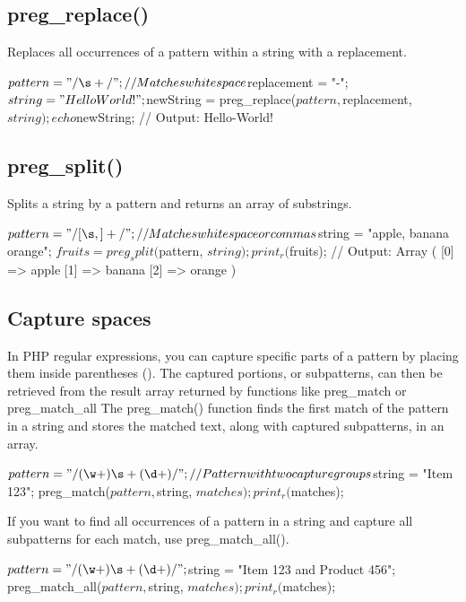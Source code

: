 \documentclass{report}
\begin{document}
 \subsection{preg\_replace()}
 \bigbreak \noindent 
 Replaces all occurrences of a pattern within a string with a replacement.
 \bigbreak \noindent 
 \begin{phpcode}
     $pattern = "/\s+/"; // Matches whitespace
     $replacement = "-";
     $string = "Hello World!";
     $newString = preg_replace($pattern, $replacement, $string);
     echo $newString; // Output: Hello-World!
 \end{phpcode}
 \bigbreak \noindent 
 \subsection{preg\_split()}
 \bigbreak \noindent 
 Splits a string by a pattern and returns an array of substrings.
 \bigbreak \noindent 
 \begin{phpcode}
     $pattern = "/[\s,]+/"; // Matches whitespace or commas
     $string = "apple, banana orange";
     $fruits = preg_split($pattern, $string);
     print_r($fruits); // Output: Array ( [0] => apple [1] => banana [2] => orange )
 \end{phpcode}

 \bigbreak \noindent 
 \subsection{Capture spaces}
 \bigbreak \noindent 
 In PHP regular expressions, you can capture specific parts of a pattern by placing them inside parentheses (). The captured portions, or subpatterns, can then be retrieved from the result array returned by functions like preg\_match or preg\_match\_all
 \bigbreak \noindent 
 The preg\_match() function finds the first match of the pattern in a string and stores the matched text, along with captured subpatterns, in an array.
 \bigbreak \noindent 
 \begin{phpcode}
     $pattern = "/(\w+)\s+(\d+)/"; // Pattern with two capture groups
     $string = "Item 123";
     preg_match($pattern, $string, $matches);
     print_r($matches);
 \end{phpcode}
 \bigbreak \noindent 
 If you want to find all occurrences of a pattern in a string and capture all subpatterns for each match, use preg\_match\_all().
 \bigbreak \noindent 
 \begin{phpcode}
     $pattern = "/(\w+)\s+(\d+)/";
     $string = "Item 123 and Product 456";
     preg_match_all($pattern, $string, $matches);
     print_r($matches);
 \end{phpcode}
\end{document}
